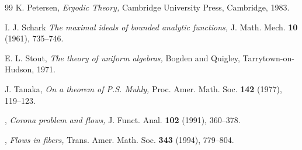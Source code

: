 \documentclass[12pt]{amsart}
\theoremstyle{plain}
\numberwithin{equation}{section}
\begin{document}
\begin{thebibliography}{99}
K. Petersen, {\em Ergodic Theory,\/ } Cambridge University Press,
Cambridge, 1983.

I. J. Schark {\em The maximal ideals of bounded analytic functions,\/}
J. Math. Mech. \textbf{10} (1961), 735--746.

E. L. Stout, {\em The theory of uniform algebras,\/} Bogden and Quigley,
Tarrytown-on-Hudson, 1971.

J. Tanaka, {\em On a theorem of P.S. Muhly,\/ } Proc. Amer. Math. Soc.
\textbf{142} (1977), 119--123.

\bysame, {\em Corona problem and flows,\/ } J. Funct. Anal. \textbf{102} (1991), 360--378.

\bysame, {\em Flows in fibers,\/ } Trans. Amer. Math. Soc.
\textbf{343} (1994), 779--804.

\end{thebibliography}
\end{document}
